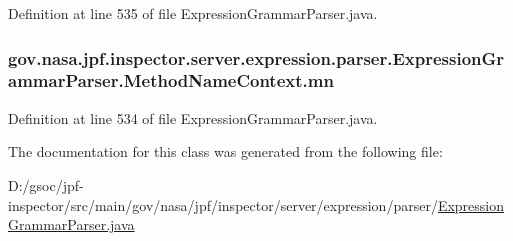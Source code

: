 Definition at line 535 of file Expression\+Grammar\+Parser.\+java.

\subsubsection[{\texorpdfstring{mn}{mn}}]{ gov.\+nasa.\+jpf.\+inspector.\+server.\+expression.\+parser.\+Expression\+Grammar\+Parser.\+Method\+Name\+Context.\+mn}\hypertarget{classgov_1_1nasa_1_1jpf_1_1inspector_1_1server_1_1expression_1_1parser_1_1_expression_grammar_parser_1_1_method_name_context_a99e8832dceca45330883ce8273391ffc}{}\label{classgov_1_1nasa_1_1jpf_1_1inspector_1_1server_1_1expression_1_1parser_1_1_expression_grammar_parser_1_1_method_name_context_a99e8832dceca45330883ce8273391ffc}


Definition at line 534 of file Expression\+Grammar\+Parser.\+java.



The documentation for this class was generated from the following file\+:\begin{DoxyCompactItemize}
\item 
D\+:/gsoc/jpf-\/inspector/src/main/gov/nasa/jpf/inspector/server/expression/parser/\hyperlink{_expression_grammar_parser_8java}{Expression\+Grammar\+Parser.\+java}\end{DoxyCompactItemize}
